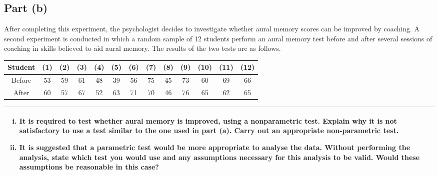 \documentclass[a4paper,12pt]{article}
\begin{document}
	\subsection*{Part (b)}
	\large
	\noindent After completing this experiment, the psychologist decides to investigate whether aural memory scores can be improved by coaching.  A second experiment is conducted in which a random sample of 12 students perform an aural memory test before and after several sessions of coaching in skills believed to aid aural memory.  The results of the two tests are as follows. \\ \medskip
	\begin{center}
		\begin{tabular}{|c||c|c|c|c|c|c|c|c|c|c|c|c|} \hline
			Student &(1)& (2) &(3) &(4) &(5) &(6) &(7) &(8)& (9)& (10)& (11)& (12)\\  \hline
			Before & 53 & 59 & 61 & 48 & 39 & 56 & 75 & 45 & 73 & 60 & 69 & 66 \\ \hline 
			After & 60 & 57 & 67 & 52 & 63 & 71 & 70 & 46 & 76 & 65 & 62& 65\\ \hline 
		\end{tabular}
	\end{center}
	\begin{table}[ht!]
		
		\centering
		
		\begin{tabular}{|p{15cm}|}
			
			\hline   \large
			\begin{enumerate}[(i)]
				\item  It is required to test whether aural memory is improved, using a nonparametric test.  Explain why it is not satisfactory to use a test similar to the one used in part (a).  Carry out an appropriate non-parametric test. 
				\item It is suggested that a parametric test would be more appropriate to analyse the data.  Without performing the analysis, state which test you would use and any assumptions necessary for this analysis to be valid.  Would these assumptions be reasonable in this case? 
			\end{enumerate}
			
			
			\\ \hline
			
		\end{tabular}
		
	\end{table}
\end{document}
